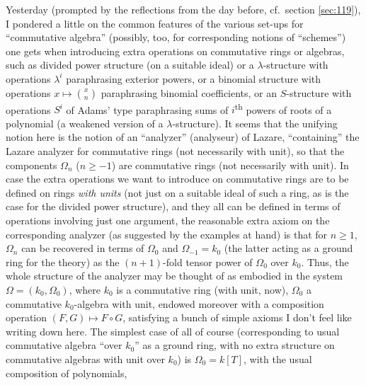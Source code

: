 \bigbreak

\presectionfill{}\par

\label{sec:120}%
Yesterday (prompted by the reflections from the day before, cf.\
section \ref{sec:119}), I pondered a little on the common features of
the various set-ups for ``commutative algebra'' (possibly, too, for
corresponding notions of ``schemes'') one gets when introducing extra
operations on commutative rings or algebras, such as divided power
structure (on a suitable ideal) or a $\lambda$-structure with
operations $\lambda^i$ paraphrasing exterior powers, or a binomial
structure with operations $x\mapsto\binom xn$ paraphrasing binomial
coefficients, or an $S$-structure with operations $S^i$ of Adams' type
paraphrasing sums of $i$\textsuperscript{th} powers of roots of a
polynomial (a weakened version of a $\lambda$-structure). It seems
that the unifying notion here is the notion of an ``analyzer''
(analyseur) of Lazare, ``containing'' the Lazare analyzer for
commutative rings (not necessarily with unit), so that the components
$\Omega_n$ ($n\ge-1$) are commutative rings (not necessarily with
unit). In case the extra operations we want to introduce on
commutative rings are to be defined on rings \emph{with units} (not
just on a suitable ideal of such a ring, as is the case for the
divided power structure), and they all can be defined in terms of
operations involving just one argument, the reasonable extra axiom on
the corresponding analyzer (as suggested by the examples at hand) is
that for $n\ge1$, $\Omega_n$ can be recovered in terms of $\Omega_0$
and $\Omega_{-1}=k_0$ (the latter acting as a ground ring for the
theory) as the $(n+1)$-fold tensor power of $\Omega_0$ over
$k_0$. Thus, the whole structure of the analyzer may be thought of as
embodied in the system $\Omega=(k_0,\Omega_0)$, where $k_0$ is a
commutative ring (with unit, now), $\Omega_0$ a commutative
$k_0$-algebra with unit, endowed moreover with a composition operation
$(F,G)\mapsto F\circ G$, satisfying a bunch of simple axioms I don't
feel like writing down here. The simplest case of all of course
(corresponding to usual commutative algebra ``over $k_0$'' as a ground
ring, with no extra structure on commutative algebras with unit over
$k_0$) is $\Omega_0=k[T]$, with the usual composition of polynomials,
